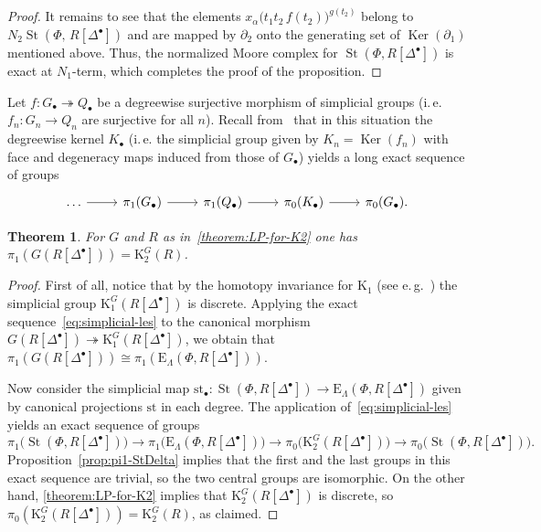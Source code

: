 \documentclass[oneside, 11pt]{amsart} \pdfoutput=1
\newcommand{\Ker}{\mathop{\mathrm{Ker}}\nolimits}
\newcommand{\K}{{\mathrm{K}}}
\newcommand{\St}{\mathop{\mathrm{St}}\nolimits}
\newcommand{\E}{\mathrm{E}}
\numberwithin{equation}{section}
\newtheorem{theorem}[lemma]{Theorem}
\theoremstyle{definition}
\begin{document}
\begin{proof}
It remains to see that the elements $x_{\alpha}\big(t_1t_2\,f(t_2)\big)^{g(t_2)}$ belong to $N_2\St(\Phi,\,R[\Delta^\bullet])$ and are mapped by $\partial_2$ onto the generating set of $\Ker(\partial_1)$ mentioned above. Thus, the normalized Moore complex for $\St(\Phi, R[\Delta^\bullet])$ is exact at $N_1$-term, which completes the proof of the proposition. \end{proof}

Let $f\colon G_\bullet\twoheadrightarrow Q_\bullet$ be a degreewise surjective morphism of simplicial groups (i.\,e. $f_n\colon G_n\to Q_n$ are surjective for all $n$). Recall from~\cite[Theorem~1.3]{Ina75} that in this situation the degreewise kernel $K_\bullet$ (i.\,e. the simplicial group given by $K_n = \Ker(f_n)$ with face and degeneracy maps induced from those of $G_\bullet$) yields a long exact sequence of groups
\begin{equation} \label{eq:simplicial-les} \begin{tikzcd} \ldots \ar{r} & \pi_{1}(G_\bullet) \ar{r} & \pi_1(Q_\bullet) \ar{r} & \pi_0(K_\bullet) \ar{r} & \pi_0(G_\bullet). \end{tikzcd} \end{equation}

\begin{theorem} \label{theorem:pi1-GRDelta}
 For $G$ and $R$ as in~\cref{theorem:LP-for-K2} one has $\pi_1(G(R[\Delta^\bullet])) = \K_2^G(R)$.
\end{theorem}
\begin{proof}
First of all, notice that by the homotopy invariance for $\K_1$ (see e.\,g.~\cite[Theorem~1.1]{Sta20}) the simplicial group $\K_1^G(R[\Delta^\bullet])$ is discrete. Applying the exact sequence~\eqref{eq:simplicial-les} to the canonical morphism $G(R[\Delta^\bullet]) \twoheadrightarrow \K_1^G(R[\Delta^\bullet])$, we obtain that $\pi_1(G( R[\Delta^\bullet])) \cong \pi_1(\E_\Lambda(\Phi, R[\Delta^\bullet]))$.

Now consider the simplicial map $\mathrm{st}_\bullet \colon \St(\Phi, R[\Delta^\bullet]) \to \E_\Lambda(\Phi, R[\Delta^\bullet])$ given by canonical projections $\mathrm{st}$ in each degree. The application of~\eqref{eq:simplicial-les} yields an exact sequence of groups
\[
\pi_1\bigl(\St(\Phi, R[\Delta^\bullet])\bigr) \to \pi_1\bigl(\E_\Lambda(\Phi, R[\Delta^\bullet])\bigr) \to \pi_0\bigl(\K_2^G( R[\Delta^\bullet])\bigr) \to \pi_0\bigl(\St(\Phi, R[\Delta^\bullet])\bigr).
\]
 Proposition~\ref{prop:pi1-StDelta} implies that the first and the last groups in this exact sequence are trivial, so the two central groups are isomorphic. On the other hand, \cref{theorem:LP-for-K2} implies that $\K_2^G(R[\Delta^\bullet])$ is discrete, so $\pi_0(\K_2^G(R[\Delta^\bullet])) = \K_2^G(R)$, as claimed.
\end{proof}
\end{document}
